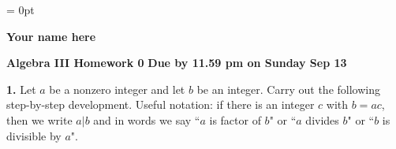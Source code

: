 \documentclass{article}
\begin{document}
\parindent = 0pt
{\centerline {\bf Your name here}}

\medskip

{\bf Algebra III Homework 0} 
\hfill {\bf Due by 11.59 pm on Sunday Sep 13}

\bigskip

\bigskip

{\bf 1.}  Let $a$ be a nonzero integer and let $b$ be an integer. Carry out the following step-by-step development. Useful notation: if there is an integer $c$ with $b = ac$, then we write $a|b$ and in words we say ``$a$ is factor of $b$" or ``$a$ divides $b$" or ``$b$ is divisible by $a$". 
\end{document}
